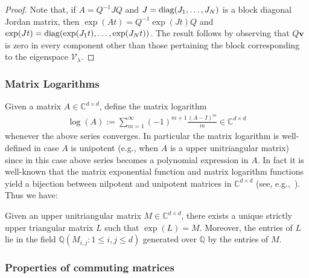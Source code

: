 \documentclass[format=acmsmall, review=false, screen=true]{acmart}
\DeclarePairedDelimiter{\diagfences}{(}{)}
\newcommand{\diag}{\operatorname{diag}\diagfences}
\newcommand{\Complex}{\mathbb{C}}
\newcommand{\Rationals}{\mathbb{Q}}
\newcommand{\myvector}{\boldsymbol}
\begin{document}
\begin{proof}
  Note that, if $A=Q^{-1}JQ$ and $J=\diag{J_{1},\ldots,J_{N}}$ is a
block diagonal Jordan matrix, then $\exp(At)=Q^{-1}\exp(Jt)Q$ and
$\exp(Jt)=\diag{\exp(J_{1}t),\ldots,\exp(J_{N}t)}$.  The result
follows by observing that $Q\myvector{v}$ is zero in every component
other than those pertaining the block corresponding to the eigenspace
$\mathcal{V}_{\lambda}$.
\end{proof}

\subsubsection{Matrix Logarithms}
Given a matrix $A \in \Complex^{d \times d}$, define the matrix logarithm
\begin{align*}
\log(A) := \sum \limits_{m=1}^{\infty}(-1)^{m+1} \frac{(A-I)^m}{m} \in \Complex^{d \times d} 
\end{align*}
whenever the above series converges.  In particular the matrix
logarithm is well-defined in case $A$ is unipotent (e.g., when $A$ is
a upper unitriangular matrix) since in this case above series becomes
a polynomial expression in $A$.  In fact it is well-known that the
matrix exponential function and matrix logarithm functions yield a
bijection between nilpotent and unipotent matrices in $\Complex^{d
  \times d}$ (see, e.g.,~\cite[Chapter 2]{Hall15}).  Thus we have:

\begin{proposition}
\label{prop:log_uniqueness}
Given an upper unitriangular matrix $M \in \Complex^{d \times d}$,
there exists a unique strictly upper triangular matrix $L$ such that
$\exp(L)=M$. Moreover, the entries of $L$ lie in the field
$\Rationals(M_{i,j}: 1 \leq i,j \leq d)$ generated over $\mathbb{Q}$
by the entries of $M$.
\end{proposition}

\subsubsection{Properties of commuting matrices}
\end{document}
